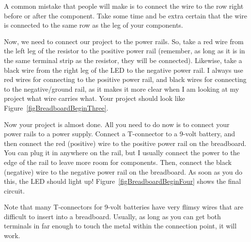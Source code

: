 
A common mistake that people will make is to connect the wire to the row right before or after the component.
Take some time and be extra certain that the wire is connected to the same row as the leg of your components.

Now, we need to connect our project to the power rails.
So, take a red wire from the left leg of the resistor to the positive power rail (remember, as long as it is in the same terminal strip as the resistor, they will be connected).
Likewise, take a black wire from the right leg of the LED to the negative power rail.
I always use red wires for connecting to the positive power rail, and black wires for connecting to the negative/ground rail, as it makes it more clear when I am looking at my project what wire carries what.
Your project should look like Figure~\ref{figBreadboardBeginThree}.


Now your project is almost done.
All you need to do now is to connect your power rails to a power supply.
Connect a T-connector to a 9-volt battery, and then connect the red (positive) wire to the positive power rail on the breadboard.  You can plug it in anywhere on the rail, but I usually connect the power to the edge of the rail to leave more room for components.
Then, connect the black (negative) wire to the negative power rail on the breadboard.
As soon as you do this, the LED should light up!
Figure~\ref{figBreadboardBeginFour} shows the final circuit.


Note that many T-connectors for 9-volt batteries have very flimsy wires that are difficult to insert into a breadboard.
Usually, as long as you can get both terminals in far enough to touch the metal within the connection point, it will work.


